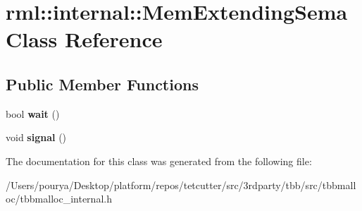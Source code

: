 \hypertarget{classrml_1_1internal_1_1MemExtendingSema}{}\section{rml\+:\+:internal\+:\+:Mem\+Extending\+Sema Class Reference}
\label{classrml_1_1internal_1_1MemExtendingSema}
\subsection*{Public Member Functions}
\begin{DoxyCompactItemize}
\item 
\hypertarget{classrml_1_1internal_1_1MemExtendingSema_a3d19c3e7d7e970580e2b1d1d04d19388}{}bool {\bfseries wait} ()\label{classrml_1_1internal_1_1MemExtendingSema_a3d19c3e7d7e970580e2b1d1d04d19388}

\item 
\hypertarget{classrml_1_1internal_1_1MemExtendingSema_a8d282e4c4f595e990d03c59fc6feb332}{}void {\bfseries signal} ()\label{classrml_1_1internal_1_1MemExtendingSema_a8d282e4c4f595e990d03c59fc6feb332}

\end{DoxyCompactItemize}


The documentation for this class was generated from the following file\+:\begin{DoxyCompactItemize}
\item 
/\+Users/pourya/\+Desktop/platform/repos/tetcutter/src/3rdparty/tbb/src/tbbmalloc/tbbmalloc\+\_\+internal.\+h\end{DoxyCompactItemize}
